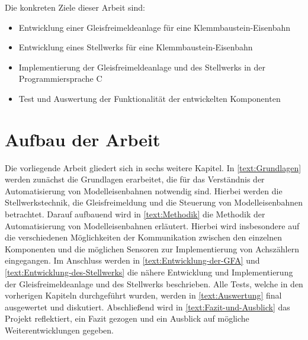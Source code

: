 Die konkreten Ziele dieser Arbeit sind:

\begin{itemize}
    \item Entwicklung einer Gleisfreimeldeanlage für eine Klemmbaustein-Eisenbahn
    \item Entwicklung eines Stellwerks für eine Klemmbaustein-Eisenbahn
    \item Implementierung der Gleisfreimeldeanlage und des Stellwerks in der Programmiersprache C
    \item Test und Auswertung der Funktionalität der entwickelten Komponenten
\end{itemize}

\section{Aufbau der Arbeit}\label{text:Einleitung:Aufbau-der-Arbeit}

Die vorliegende Arbeit gliedert sich in sechs weitere Kapitel. In \autoref{text:Grundlagen} werden zunächst die Grundlagen erarbeitet, die für das Verständnis der Automatisierung von Modelleisenbahnen notwendig sind. Hierbei werden die Stellwerkstechnik, die Gleisfreimeldung und die Steuerung von Modelleisenbahnen betrachtet. Darauf aufbauend wird in \autoref{text:Methodik} die Methodik der Automatisierung von Modelleisenbahnen erläutert. Hierbei wird insbesondere auf die verschiedenen Möglichkeiten der Kommunikation zwischen den einzelnen Komponenten und die möglichen Sensoren zur Implementierung von Achszählern eingegangen. Im Anschluss werden in \autoref{text:Entwicklung-der-GFA} und \autoref{text:Entwicklung-des-Stellwerks} die nähere Entwicklung und Implementierung der Gleisfreimeldeanlage und des Stellwerks beschrieben. Alle Tests, welche in den vorherigen Kapiteln durchgeführt wurden, werden in \autoref{text:Auswertung} final ausgewertet und diskutiert. Abschließend wird in \autoref{text:Fazit-und-Ausblick} das Projekt reflektiert, ein Fazit gezogen und ein Ausblick auf mögliche Weiterentwicklungen gegeben.

